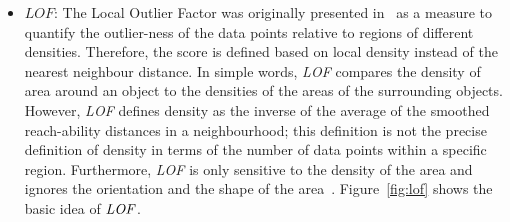 \begin{description}
\begin{itemize}
		\item $LOF$: The Local Outlier Factor was originally presented in~\cite{Breunig2000} as a measure to quantify the outlier-ness of the data points relative to regions of different densities. Therefore, the score is defined based on local density instead of the nearest neighbour distance. In simple words, \textit{LOF} compares the density of area around an object to the densities of the areas of the surrounding objects. However, \textit{LOF} defines density as the inverse of the average of the smoothed reach-ability distances in a neighbourhood; this definition is not the precise definition of density in terms of the number of data points within a specific region. Furthermore, \textit{LOF} is only sensitive to the density of the area and  ignores the orientation and the shape of the area~\cite{JinTHW06}. Figure~\ref{fig:lof} shows the basic idea of $\it{LOF}$.
		
				
				

\end{itemize}
\end{description}
